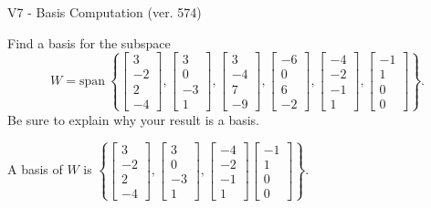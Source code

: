 \begin{exercise}
  \begin{exerciseTitle}V7 - Basis Computation (ver. 574)\end{exerciseTitle}
  \begin{exerciseStatement}
    Find a basis for the subspace 
\[W=\mathrm{span}\ \left\{\left[\begin{array}{r}
3 \\
-2 \\
2 \\
-4
\end{array}\right] , \left[\begin{array}{r}
3 \\
0 \\
-3 \\
1
\end{array}\right] , \left[\begin{array}{r}
3 \\
-4 \\
7 \\
-9
\end{array}\right] , \left[\begin{array}{r}
-6 \\
0 \\
6 \\
-2
\end{array}\right] , \left[\begin{array}{r}
-4 \\
-2 \\
-1 \\
1
\end{array}\right] , \left[\begin{array}{r}
-1 \\
1 \\
0 \\
0
\end{array}\right]\right\}.\]
 Be sure to explain why your result is a basis.


  \end{exerciseStatement}
  \begin{exerciseAnswer}
   A basis of \(W\) is  \(\left\{\left[\begin{array}{r}
3 \\
-2 \\
2 \\
-4
\end{array}\right] , \left[\begin{array}{r}
3 \\
0 \\
-3 \\
1
\end{array}\right] , \left[\begin{array}{r}
-4 \\
-2 \\
-1 \\
1
\end{array}\right] \left[\begin{array}{r}
-1 \\
1 \\
0 \\
0
\end{array}\right]\right\}\).
  


  \end{exerciseAnswer}
\end{exercise}